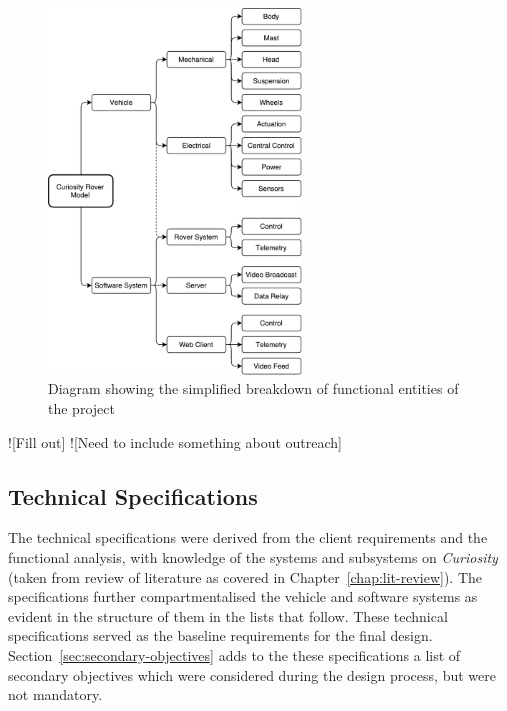     \begin{figure}[h]
      \centering
      \includegraphics[width=0.6\textwidth]{figures/specs-functionalBreakdown}
      \caption[Diagram showing the simplified breakdown of functional entities of the project]{Diagram showing the simplified breakdown of functional entities of the project}
      \label{fig:specs-functionalBreakdown}
    \end{figure}
    
    ![Fill out]
    ![Need to include something about outreach]
    
  \subsection{Technical Specifications}
    The technical specifications were derived from the client requirements and the functional analysis, with knowledge of the systems and subsystems on \textit{Curiosity} (taken from review of literature as covered in Chapter~\ref{chap:lit-review}). The specifications further compartmentalised the vehicle and software systems as evident in the structure of them in the lists that follow. These technical specifications served as the baseline requirements for the final design. Section~\ref{sec:secondary-objectives} adds to the these specifications a list of secondary objectives which were considered during the design process, but were not mandatory.
    
